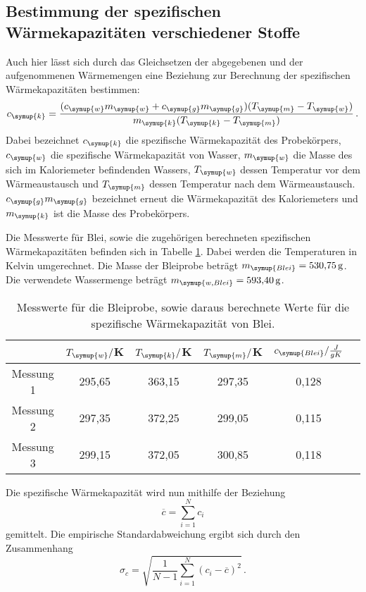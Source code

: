 \subsection{Bestimmung der spezifischen Wärmekapazitäten verschiedener Stoffe}
\label{sec:Auswertung_stoffe}

Auch hier lässt sich durch das Gleichsetzen der abgegebenen und der aufgenommenen
Wärmemengen eine Beziehung zur Berechnung der spezifischen Wärmekapazitäten bestimmen:
\begin{equation}
  c_{\symup{k}}=\frac{(c_{\symup{w}}m_{\symup{w}}+c_{\symup{g}}m_{\symup{g}})
  (T_{\symup{m}}-T_{\symup{w}})}{m_{\symup{k}}(T_{\symup{k}}-T_{\symup{m}})}\,.
\end{equation}
Dabei bezeichnet $c_{\symup{k}}$ die spezifische Wärmekapazität des Probekörpers,
$c_{\symup{w}}$ die spezifische Wärmekapazität von Wasser, $m_{\symup{w}}$ die
Masse des sich im Kaloriemeter befindenden Wassers, $T_{\symup{w}}$ dessen Temperatur
vor dem Wärmeaustausch und $T_{\symup{m}}$ dessen Temperatur nach dem Wärmeaustausch.
$c_{\symup{g}}m_{\symup{g}}$ bezeichnet erneut die Wärmekapazität des Kaloriemeters
und $m_{\symup{k}}$ ist die Masse des Probekörpers.

Die Messwerte für Blei, sowie die zugehörigen berechneten spezifischen Wärmekapazitäten
befinden sich in Tabelle \ref{tab:blei}. Dabei werden die Temperaturen in Kelvin umgerechnet.
Die Masse der Bleiprobe beträgt $m_{\symup{Blei}}=\SI{530.75}{\gram}$. Die verwendete
Wassermenge beträgt $m_{\symup{w,Blei}}=\SI{593.40}{\gram}$.

\begin{table}
  \centering
  \caption{Messwerte für die Bleiprobe, sowie daraus berechnete Werte für die spezifische
  Wärmekapazität von Blei.}
  \label{tab:blei}
  \begin{tabular}{c c c c c c}
    \toprule
    & $T_{\symup{w}}/$K & $T_{\symup{k}}/$K & $T_{\symup{m}}/$K & $c_{\symup{Blei}}/\frac{J}{g K}$ \\
    \midrule
    Messung 1 & 295,65 & 363,15 & 297,35 & 0,128 \\
    Messung 2 & 297,35 & 372,25 & 299,05 & 0,115 \\
    Messung 3 & 299,15 & 372,05 & 300,85 & 0,118 \\
    \bottomrule
  \end{tabular}
\end{table}

Die spezifische Wärmekapazität wird nun mithilfe der Beziehung
\begin{equation}
  \overline{c} = \sum\limits_{i = 1}^N c_i
  \label{eqn:mean}
\end{equation}
gemittelt. Die empirische Standardabweichung ergibt sich durch den Zusammenhang
\begin{equation}
  \sigma_c = \sqrt{\frac{1}{N-1}
    \sum\limits_{i = 1}^N
    (c_i-\overline{c})^2} \,.
    \label{eqn:std}
\end{equation}

